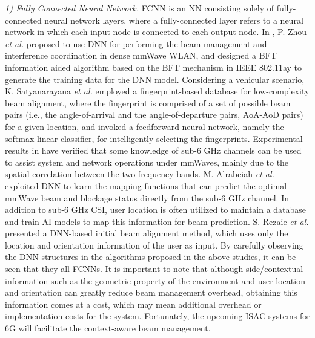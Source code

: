 \documentclass[journal,comsoc]{IEEEtran}
\begin{document}
\emph{1) Fully Connected Neural Network.} FCNN is an NN consisting solely of fully-connected neural network layers, where a fully-connected layer refers to a neural network in which each input node is connected to each output node. In \cite{Deep-Learning-Beam-Management-Interference-Coordination-2019}, P. Zhou \emph{et al.} proposed to use DNN for performing the beam management and interference coordination in dense mmWave WLAN, and designed a BFT information aided algorithm based on the BFT mechanism in IEEE 802.11ay to generate the training data for the DNN model. Considering a vehicular scenario, K. Satyanarayana \emph{et al.} \cite{Deep-Learning-Aided-Fingerprint-Beam-Alignment-2019} employed a fingerprint-based database for low-complexity beam alignment, where the fingerprint is comprised of a set of possible beam pairs (i.e., the angle-of-arrival and the angle-of-departure pairs, AoA-AoD pairs) for a given location, and invoked a feedforward neural network, namely the softmax linear classifier, for intelligently selecting the fingerprints. Experimental results in \cite{Steering-eyes-closed,Out-of-Band-Millimeter-Beamforming,Deep-Learning-Assisted-Beam-Prediction-2020,Deep-Learning-mmWave-Beam-Prediction-2021} have verified that some knowledge of sub-6 GHz channels can be used to assist system and network operations under mmWaves, mainly due to the spatial correlation between the two frequency bands. M. Alrabeiah \emph{et al.} \cite{Deep-Learning-mmWave-Beam-Blockage-Prediction-2020} exploited DNN to learn the mapping functions that can predict the optimal mmWave beam and blockage status directly from the sub-6 GHz channel. In addition to sub-6 GHz CSI, user location is often utilized to maintain a database and train AI models to map this information for beam prediction. S. Rezaie \emph{et al.} \cite{A-Deep-Learning-Approach-Location-2022} presented a DNN-based initial beam alignment method, which uses only the location and orientation information of the user as input. By carefully observing the DNN structures in the algorithms proposed in the above studies, it can be seen that they all FCNNs. It is important to note that although side/contextual information such as the geometric property of the environment and user location and orientation can greatly reduce beam management overhead, obtaining this information comes at a cost, which may mean additional overhead or implementation costs for the system. Fortunately, the upcoming ISAC systems for 6G will facilitate the context-aware beam management.
\end{document}
